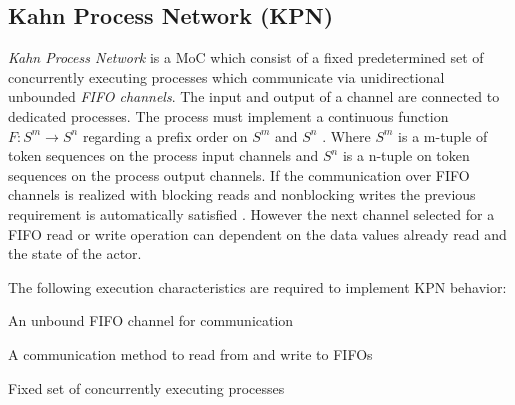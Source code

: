 \subsection{Kahn Process Network (KPN)}
\emph{Kahn Process Network} \cite{kahn:1974} is a MoC
which consist of a fixed predetermined set of
concurrently executing processes which communicate via unidirectional
unbounded \emph{FIFO channels}. The input and output of a channel
are connected to dedicated processes. The process must implement
a continuous function $F: S^m \to S^n$ regarding a prefix order on
$S^m$ and $S^n$ \cite{kahn:1974} \cite{stark87concurrent:1987}.
Where $S^m$ is a m-tuple of token sequences on the process input channels
and $S^n$ is a n-tuple on token sequences on the process output channels.
If the communication over FIFO channels is realized with blocking
reads and nonblocking writes the previous requirement is automatically
satisfied \cite{stark87concurrent:1987}. However the next channel
selected for a FIFO read or write operation can dependent on
the data values already read and the state of the actor.


The following execution characteristics are required to
implement KPN behavior:

\begin{characteristic}\label{characteristic-kpn-fifo}
  An unbound FIFO channel for communication
\end{characteristic}

\begin{characteristic}\label{characteristic-kpn-fifo-read-write}
  A communication method to read from and write to FIFOs
\end{characteristic}

\begin{characteristic}\label{characteristic-kpn-concurrent-processes}
  Fixed set of concurrently executing processes
\end{characteristic}

